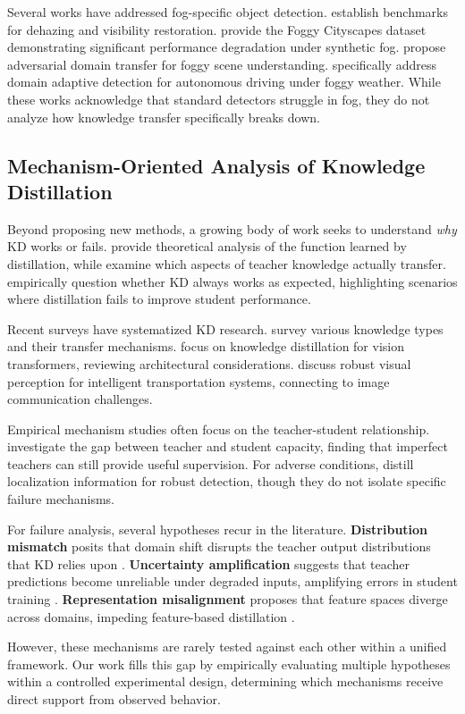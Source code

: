 Several works have addressed fog-specific object detection. \cite{li2018benchmarking} establish benchmarks for dehazing and visibility restoration. \cite{sakaridis2018semantic} provide the Foggy Cityscapes dataset demonstrating significant performance degradation under synthetic fog. \cite{valluripalli2021foggy} propose adversarial domain transfer for foggy scene understanding. \cite{li2022domain} specifically address domain adaptive detection for autonomous driving under foggy weather. While these works acknowledge that standard detectors struggle in fog, they do not analyze how knowledge transfer specifically breaks down.

\subsection{Mechanism-Oriented Analysis of Knowledge Distillation}

Beyond proposing new methods, a growing body of work seeks to understand \emph{why} KD works or fails. \cite{phuong2019functional} provide theoretical analysis of the function learned by distillation, while \cite{cho2019efficacy} examine which aspects of teacher knowledge actually transfer. \cite{stanton2021does} empirically question whether KD always works as expected, highlighting scenarios where distillation fails to improve student performance.

Recent surveys have systematized KD research. \cite{gou2021knowledge} survey various knowledge types and their transfer mechanisms. \cite{beyer2022knowledge} focus on knowledge distillation for vision transformers, reviewing architectural considerations. \cite{wang2024robust} discuss robust visual perception for intelligent transportation systems, connecting to image communication challenges.

Empirical mechanism studies often focus on the teacher-student relationship. \cite{mirzadeh2020improved} investigate the gap between teacher and student capacity, finding that imperfect teachers can still provide useful supervision. For adverse conditions, \cite{gao2023distilling} distill localization information for robust detection, though they do not isolate specific failure mechanisms.

For failure analysis, several hypotheses recur in the literature. \textbf{Distribution mismatch} posits that domain shift disrupts the teacher output distributions that KD relies upon \cite{wang2020cross, yang2021cross}. \textbf{Uncertainty amplification} suggests that teacher predictions become unreliable under degraded inputs, amplifying errors in student training \cite{kendall2017uncertainties, qiao2023uncertainty}. \textbf{Representation misalignment} proposes that feature spaces diverge across domains, impeding feature-based distillation \cite{sun2016deep, li2022cross}.

However, these mechanisms are rarely tested against each other within a unified framework. Our work fills this gap by empirically evaluating multiple hypotheses within a controlled experimental design, determining which mechanisms receive direct support from observed behavior.
